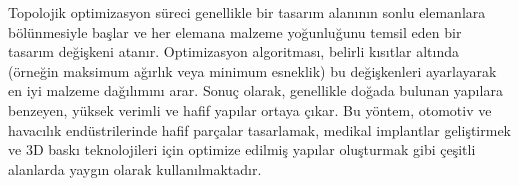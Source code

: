 Topolojik optimizasyon süreci genellikle bir tasarım alanının sonlu elemanlara bölünmesiyle başlar ve her elemana malzeme yoğunluğunu temsil eden bir tasarım değişkeni atanır. Optimizasyon algoritması, belirli kısıtlar altında (örneğin maksimum ağırlık veya minimum esneklik) bu değişkenleri ayarlayarak en iyi malzeme dağılımını arar. Sonuç olarak, genellikle doğada bulunan yapılara benzeyen, yüksek verimli ve hafif yapılar ortaya çıkar. Bu yöntem, otomotiv ve havacılık endüstrilerinde hafif parçalar tasarlamak, medikal implantlar geliştirmek ve 3D baskı teknolojileri için optimize edilmiş yapılar oluşturmak gibi çeşitli alanlarda yaygın olarak kullanılmaktadır.
